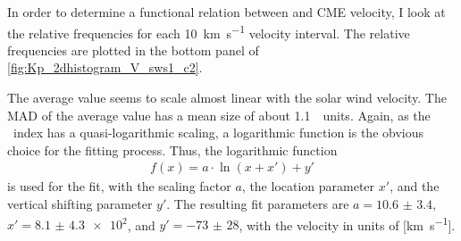 In order to determine a functional relation between \Kp{} and CME velocity, I look at the relative \Kp{} frequencies for each \SI{10}{\km\per\s} velocity interval. The relative frequencies are plotted in the bottom panel of \autoref{fig:Kp_2dhistogram_V_sws1_c2}.
\begin{figure}
\end{figure}
The average \Kp{} value seems to scale almost linear with the solar wind velocity. The MAD of the average \Kp{} value has a mean size of about \SI{1.1}{\Kp~units}.
Again, as the \Kp~index has a quasi-logarithmic scaling, a logarithmic function is the obvious choice for the fitting process. Thus, the logarithmic function
\begin{align}
	f(x) = a \cdot \ln\left(x + x'\right) + y'	\label{eq:log_offset_fit_function}
\end{align}
is used for the fit, with the scaling factor $a$, the location parameter $x'$, and the vertical shifting parameter $y'$. The resulting fit parameters are $a = \num{10.6(34)}$, $x' = \num{8.1(43)e2}$, and $y' = \num{-73(28)}$, with the velocity in units of [\si{\km\per\s}].

